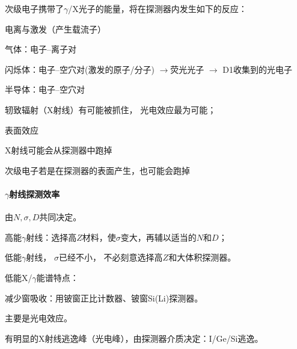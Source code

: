次级电子携带了$\gamma$/X光子的能量，将在探测器内发生如下的反应：
\begin{compactitem}
	\item 电离与激发（产生载流子）
	\begin{compactitem}
		\item 气体：电子--离子对
		\item 闪烁体：电子--空穴对(激发的原子/分子) $\to$荧光光子%
		$\to$ D1收集到的光电子
		\item 半导体：电子--空穴对
	\end{compactitem}
	\item 轫致辐射（X射线）有可能被抓住，
	光电效应最为可能；
	\item 表面效应
	\begin{compactitem}
		\item X射线可能会从探测器中跑掉
		\item 次级电子若是在探测器的表面产生，也可能会跑掉
	\end{compactitem}
\end{compactitem}
\paragraph{$\gamma$射线探测效率}由$N,\sigma,D$共同决定。
\begin{compactitem}
	\item 高能$\gamma$射线：选择高$Z$材料，使$\sigma$变大，再辅以适当的$N$和$D$；
	\item 低能$\gamma$射线，%
	$\sigma$已经不小，%
	不必刻意选择高$Z$和大体积探测器。
\end{compactitem}
低能X/$\gamma$能谱特点：
\begin{compactitem}
	\item 减少窗吸收：用铍窗正比计数器、铍窗Si(Li)探测器。
	\item 主要是光电效应。
	\item 有明显的X射线逃逸峰（光电峰），由探测器介质决定：I/Ge/Si逃逸。
\end{compactitem}
